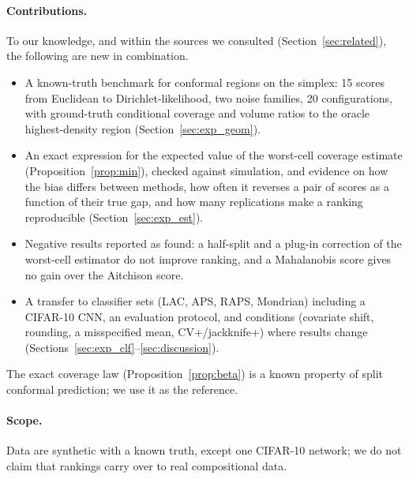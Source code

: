 \paragraph{Contributions.}
To our knowledge, and within the sources we consulted (Section~\ref{sec:related}), the following are new in combination.
\begin{itemize}\setlength\itemsep{0pt}
\item A known-truth benchmark for conformal regions on the simplex: 15 scores from Euclidean to Dirichlet-likelihood, two noise families, 20 configurations, with ground-truth conditional coverage and volume ratios to the oracle highest-density region (Section~\ref{sec:exp_geom}).
\item An exact expression for the expected value of the worst-cell coverage estimate (Proposition~\ref{prop:min}), checked against simulation, and evidence on how the bias differs between methods, how often it reverses a pair of scores as a function of their true gap, and how many replications make a ranking reproducible (Section~\ref{sec:exp_est}).
\item Negative results reported as found: a half-split and a plug-in correction of the worst-cell estimator do not improve ranking, and a Mahalanobis score gives no gain over the Aitchison score.
\item A transfer to classifier sets (LAC, APS, RAPS, Mondrian) including a CIFAR-10 CNN, an evaluation protocol, and conditions (covariate shift, rounding, a misspecified mean, CV+/jackknife+) where results change (Sections~\ref{sec:exp_clf}--\ref{sec:discussion}).
\end{itemize}
The exact coverage law (Proposition~\ref{prop:beta}) is a known property of split conformal prediction; we use it as the reference.

\paragraph{Scope.}
Data are synthetic with a known truth, except one CIFAR-10 network; we do not claim that rankings carry over to real compositional data.
